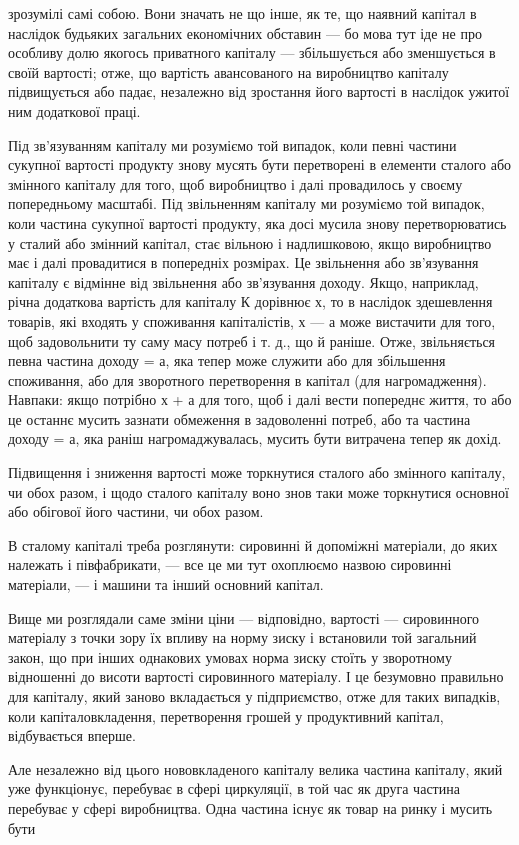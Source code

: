 \parcont{}  %
зрозумілі самі собою. Вони значать не що інше, як те, що наявний
капітал в наслідок будьяких загальних економічних обставин
— бо мова тут іде не про особливу долю якогось приватного
капіталу — збільшується або зменшується в своїй вартості;
отже, що вартість авансованого на виробництво капіталу
підвищується або падає, незалежно від зростання його вартості
в наслідок ужитої ним додаткової праці.

Під зв’язуванням капіталу ми розуміємо той випадок, коли
певні частини сукупної вартості продукту знову мусять бути
перетворені в елементи сталого або змінного капіталу для
того, щоб виробництво і далі провадилось у своєму попередньому
масштабі. Під звільненням капіталу ми розуміємо той
випадок, коли частина сукупної вартості продукту, яка досі
мусила знову перетворюватись у сталий або змінний капітал,
стає вільною і надлишковою, якщо виробництво має і далі провадитися
в попередніх розмірах. Це звільнення або зв’язування
капіталу є відмінне від звільнення або зв’язування доходу. Якщо,
наприклад, річна додаткова вартість для капіталу К дорівнює
х, то в наслідок здешевлення товарів, які входять у споживання
капіталістів, х — а може вистачити для того, щоб задовольнити
ту саму масу потреб і т. д., що й раніше. Отже,
звільняється певна частина доходу = а, яка тепер може служити
або для збільшення споживання, або для зворотного перетворення
в капітал (для нагромадження). Навпаки: якщо потрібно
х + а для того, щоб і далі вести попереднє життя, то або це
останнє мусить зазнати обмеження в задоволенні потреб, або
та частина доходу = а, яка раніш нагромаджувалась, мусить бути
витрачена тепер як дохід.

Підвищення і зниження вартості може торкнутися сталого
або змінного капіталу, чи обох разом, і щодо сталого капіталу
воно знов таки може торкнутися основної або обігової його
частини, чи обох разом.

В сталому капіталі треба розглянути: сировинні й допоміжні
матеріали, до яких належать і півфабрикати, — все це ми тут
охоплюємо назвою сировинні матеріали, — і машини та інший
основний капітал.

Вище ми розглядали саме зміни ціни — відповідно, вартості —
сировинного матеріалу з точки зору їх впливу на норму зиску
і встановили той загальний закон, що при інших однакових умовах
норма зиску стоїть у зворотному відношенні до висоти вартості
сировинного матеріалу. І це безумовно правильно для
капіталу, який заново вкладається у підприємство, отже для
таких випадків, коли капіталовкладення, перетворення грошей
у продуктивний капітал, відбувається вперше.

Але незалежно від цього нововкладеного капіталу велика
частина капіталу, який уже функціонує, перебуває в сфері
циркуляції, в той час як друга частина перебуває у сфері виробництва.
Одна частина існує як товар на ринку і мусить бути
\parbreak{}  %
